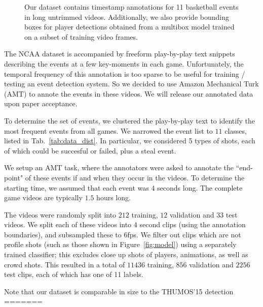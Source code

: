 \begin{figure}

  \caption{Our dataset contains timestamp annotations for 11 basketball events
    in long untrimmed videos. Additionally, we also provide bounding boxes for player
    detections obtained from a multibox model trained on a subset of training
  video frames.}
\end{figure}

The NCAA dataset is accompanied by freeform play-by-play text snippets
describing the events at a few key-moments in each game.  Unfortunately, the
temporal frequency of this annotation is too sparse to be useful for training /
testing an event detection system.  So we decided to use Amazon Mechanical Turk
(AMT) to annote the events in these videos. We will release our annotated data
upon paper acceptance.

To determine the set of events, we clustered the play-by-play text to identify
the most frequent events from all games. We narrowed the event list to $11$
classes, listed in Tab.~\ref{tab:data_dist}.  In particular, we considered
5 types of shots, each of which could be succesful or failed, plus a steal
event. 

We setup an AMT task, where the annotators were asked to annotate the
``end-point" of these events if and when they occur in the videos.  To
determine the starting time, we assumed that each event was 4 seconds long.
The complete game videos are typically $1.5$ hours long.

The videos were randomly split into $212$ training, $12$ validation and $33$
test videos.  We split each of these videos into 4 second clips (using the
annotation boundaries), and subsampled these to 6fps.  We filter out clips
which are not profile shots (such as those shown in Figure~\ref{fig:model})
using a separately trained classifier; this excludes close up shots of players,
animations, as well as crowd shots.  This resulted in a total of $11436$
training, $856$ validation and $2256$ test clips, each of which has one of 11
labels.

Note that our dataset is comparable in size to the THUMOS'15 detection
=======

